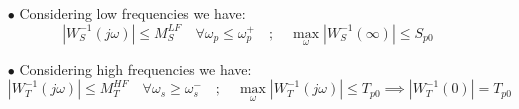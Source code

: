 \documentclass{article}
\numberwithin{equation}{subsection}
\begin{document}
	\begin{enumerate}
		\item[$\bullet$] Considering low frequencies we have:
		\begin{equation}
			\left| W_S^{-1}(j\omega) \right| \leq M_S^{LF} \quad \forall 	\omega_p\leq\omega_p^+ \quad ; \quad \max_\omega \left| W_S^{-1}(\infty) \right| \leq S_{p0}
		\end{equation}	
		\item[$\bullet$] Considering high frequencies we have:
		\begin{equation}
			\left| W_T^{-1}(j\omega) \right| \leq M_T^{HF} \quad \forall 	\omega_s\geq\omega_s^- \quad ; \quad \max_\omega \left| W_T^{-1}(j\omega) \right| \leq T_{p0} \implies \left| W_T^{-1}(0) \right| = T_{p0}
		\end{equation}
	\end{enumerate}
	
\end{document}
